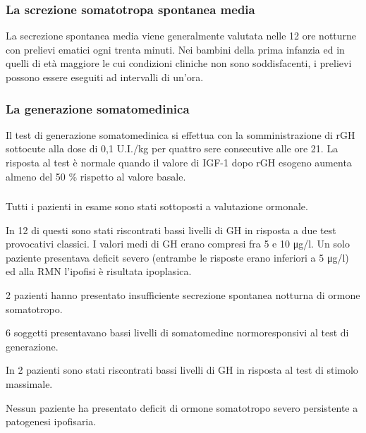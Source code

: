 \subsubsection*{La screzione somatotropa spontanea media}
La secrezione spontanea media viene generalmente valutata nelle 12 ore notturne con prelievi ematici ogni trenta minuti. Nei bambini della prima infanzia ed in quelli di età maggiore le cui condizioni cliniche non sono soddisfacenti, i prelievi possono essere eseguiti ad intervalli di un'ora.

\subsubsection*{La generazione somatomedinica}
Il test di generazione somatomedinica si effettua con la somministrazione di rGH sottocute alla dose di 0,1 U.I./kg per quattro sere consecutive alle ore 21. La risposta al test è normale quando il valore di IGF-1 dopo rGH esogeno aumenta almeno del 50 \%
rispetto al valore basale.

\subsubsection*{}
Tutti i pazienti in esame sono stati sottoposti a valutazione ormonale. 

In 12 di questi sono stati riscontrati bassi livelli di GH in risposta a due test provocativi classici. I valori medi di GH erano compresi fra 5 e 10 \unit{\micro g}/l. Un solo paziente presentava deficit severo (entrambe le risposte erano inferiori a 5 \unit{\micro g}/l) ed alla RMN l'ipofisi è risultata ipoplasica.

2 pazienti hanno presentato insufficiente secrezione spontanea notturna di ormone somatotropo.

6 soggetti presentavano bassi livelli di somatomedine normoresponsivi al test di generazione.


In 2 pazienti sono stati riscontrati bassi livelli di GH in risposta al test di stimolo massimale.

Nessun paziente ha presentato deficit di ormone somatotropo severo persistente a patogenesi ipofisaria. 
